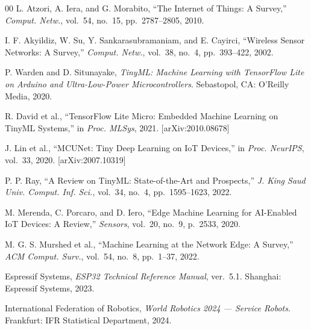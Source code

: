 \documentclass[conference]{IEEEtran}
\begin{document}
\begin{thebibliography}{00}
L. Atzori, A. Iera, and G. Morabito,
``The Internet of Things: A Survey,''
\textit{Comput. Netw.}, vol.~54, no.~15, pp.~2787--2805, 2010.

I. F. Akyildiz, W. Su, Y. Sankarasubramaniam, and E. Cayirci,
``Wireless Sensor Networks: A Survey,''
\textit{Comput. Netw.}, vol.~38, no.~4, pp.~393--422, 2002.

P. Warden and D. Situnayake,
\textit{TinyML: Machine Learning with TensorFlow Lite on Arduino and
Ultra-Low-Power Microcontrollers}.
Sebastopol, CA: O'Reilly Media, 2020.

R. David et al.,
``TensorFlow Lite Micro: Embedded Machine Learning on TinyML Systems,''
in \textit{Proc. MLSys}, 2021. [arXiv:2010.08678]

J. Lin et al.,
``MCUNet: Tiny Deep Learning on IoT Devices,''
in \textit{Proc. NeurIPS}, vol.~33, 2020. [arXiv:2007.10319]

P. P. Ray,
``A Review on TinyML: State-of-the-Art and Prospects,''
\textit{J. King Saud Univ. Comput. Inf. Sci.}, vol.~34, no.~4,
pp.~1595--1623, 2022.

M. Merenda, C. Porcaro, and D. Iero,
``Edge Machine Learning for AI-Enabled IoT Devices: A Review,''
\textit{Sensors}, vol.~20, no.~9, p.~2533, 2020.

M. G. S. Murshed et al.,
``Machine Learning at the Network Edge: A Survey,''
\textit{ACM Comput. Surv.}, vol.~54, no.~8, pp.~1--37, 2022.

Espressif Systems,
\textit{ESP32 Technical Reference Manual}, ver.~5.1.
Shanghai: Espressif Systems, 2023.

International Federation of Robotics,
\textit{World Robotics 2024 --- Service Robots}.
Frankfurt: IFR Statistical Department, 2024.

\end{thebibliography}
\end{document}
